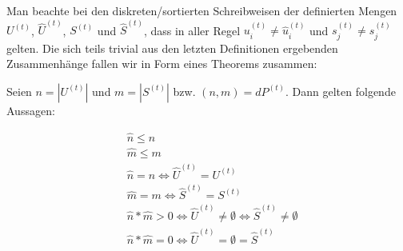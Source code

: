 Man beachte bei den diskreten/sortierten Schreibweisen der definierten Mengen $U^{(t)}$, $\widehat{U}^{(t)}$, $S^{(t)}$ und $\widehat{S}^{(t)}$, dass in aller Regel $u^{(t)}_i \neq \widehat{u}^{(t)}_i$ und $s^{(t)}_j \neq \widehat{s}^{(t)}_j$ gelten. Die sich teils trivial aus den letzten Definitionen ergebenden Zusammenhänge fallen wir in Form eines Theorems zusammen:

\vspace{0.3cm}

\begin{Theorem}

Seien $n = |U^{(t)}|$ und $m = |S^{(t)}|$ bzw. $(n, m) = dP^{(t)}$. Dann gelten folgende Aussagen:

\begin{align}
&\widehat{n} \leq n \tag{i.u} \\ 
&\widehat{m} \leq m \tag{i.s} \\
&\widehat{n} = n \Leftrightarrow \widehat{U}^{(t)} = U^{(t)} \tag{ii.u} \\
&\widehat{m} = m \Leftrightarrow \widehat{S}^{(t)} = S^{(t)} \tag{ii.s} \\
&\widehat{n} * \widehat{m} > 0 \Leftrightarrow \widehat{U}^{(t)} \neq \emptyset \Leftrightarrow \widehat{S}^{(t)} \neq \emptyset \tag{iii} \\
&\widehat{n} * \widehat{m} = 0 \Leftrightarrow \widehat{U}^{(t)} = \emptyset = \widehat{S}^{(t)} \tag{iv}
\end{align}

\end{Theorem}

\vspace{0.3cm}

